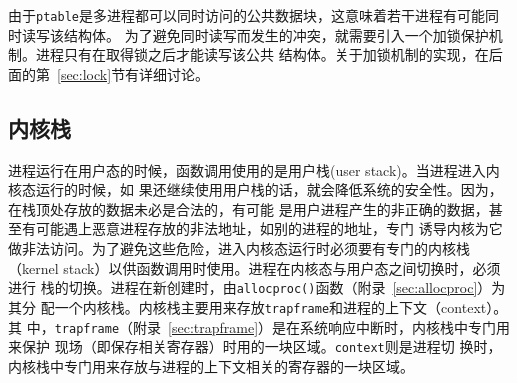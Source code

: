 \documentclass{swfuthesism}
\begin{document}
由于\texttt{ptable}是多进程都可以同时访问的公共数据块，这意味着若干进程有可能同时读写该结构体。
为了避免同时读写而发生的冲突，就需要引入一个加锁保护机制。进程只有在取得锁之后才能读写该公共
结构体。关于加锁机制的实现，在后面的第~\ref{sec:lock}节有详细讨论。

\subsection{内核栈}

进程运行在用户态的时候，函数调用使用的是用户栈(user stack)。当进程进入内核态运行的时候，如
果还继续使用用户栈的话，就会降低系统的安全性。因为，在栈顶处存放的数据未必是合法的，有可能
是用户进程产生的非正确的数据，甚至有可能遇上恶意进程存放的非法地址，如别的进程的地址，专门
诱导内核为它做非法访问。为了避免这些危险，进入内核态运行时必须要有专门的内核栈（kernel
stack）以供函数调用时使用\cite{stack:kernelstack}。进程在内核态与用户态之间切换时，必须进行
栈的切换。进程在新创建时，由\texttt{allocproc()}函数（附录~\ref{sec:allocproc}）为其分
配一个内核栈。内核栈主要用来存放\texttt{trapframe}和进程的上下文（context）。其
中，\texttt{trapframe}（附录~\ref{sec:trapframe}）是在系统响应中断时，内核栈中专门用来保护
现场（即保存相关寄存器）时用的一块区域\cite{stack:kernelstack2}。\texttt{context}则是进程切
换时，内核栈中专门用来存放与进程的上下文相关的寄存器的一块区域。



\end{document}
